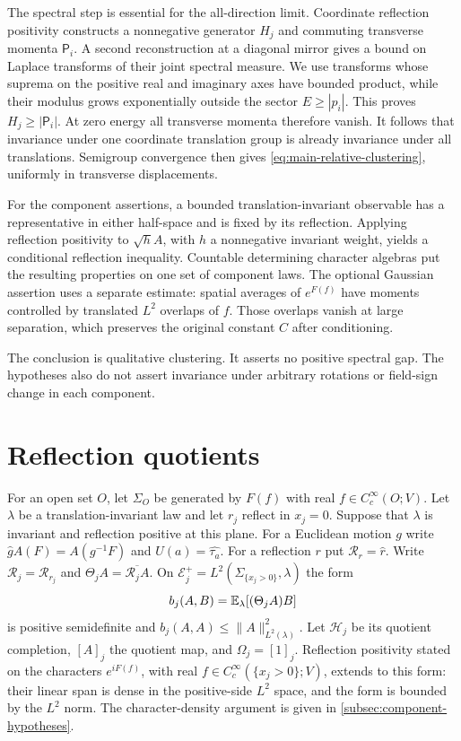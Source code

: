 The spectral step is essential for the all-direction limit.
Coordinate reflection positivity constructs a nonnegative generator
\(H_j\) and commuting transverse momenta \(\mathsf P_i\).
A second reconstruction at a diagonal mirror gives a bound on
Laplace transforms of their joint spectral measure. We use
transforms whose suprema on the positive real and imaginary axes
have bounded product, while their modulus grows exponentially
outside the sector \(E\ge|p_i|\).
This proves \(H_j\ge|\mathsf P_i|\).
At zero energy all transverse momenta therefore vanish.
It follows that invariance under one coordinate translation group
is already invariance under all translations. Semigroup convergence
then gives \eqref{eq:main-relative-clustering}, uniformly in
transverse displacements.

For the component assertions, a bounded translation-invariant
observable has a representative in either half-space and is fixed
by its reflection. Applying reflection positivity to \(\sqrt h A\),
with \(h\) a nonnegative invariant weight, yields a conditional
reflection inequality. Countable determining character algebras
put the resulting properties on one set of component laws.
The optional Gaussian assertion uses a separate estimate:
spatial averages of \(e^{F(f)}\) have moments controlled by
translated \(L^2\) overlaps of \(f\). Those overlaps vanish at
large separation, which preserves the original constant \(C\)
after conditioning.

The conclusion is qualitative clustering. It asserts no positive
spectral gap. The hypotheses also do not assert invariance under
arbitrary rotations or field-sign change in each component.
\section{Reflection quotients}\label{sec:quotients}
For an open set $O$, let $\Sigma_O$ be generated by $F(f)$ with
real $f\in C_c^\infty(O;V)$. Let $\lambda$ be a
translation-invariant law and let $r_j$ reflect in $x_j=0$.
Suppose that $\lambda$ is invariant and reflection positive at this
plane. For a Euclidean motion $g$ write
$\widehat g A(F)=A(g^{-1}F)$ and $U(a)=\widehat{\tau_a}$.
For a reflection $r$ put
$\mathcal R_r=\widehat r$. Write $\mathcal R_j=\mathcal R_{r_j}$ and
$\Theta_j A=\overline{\mathcal R_j A}$.
On $\mathcal E_j^+=L^2(\Sigma_{\{x_j>0\}},\lambda)$ the form
\[
 b_j(A,B)=\mathbb E_\lambda[(\Theta_j A)B]
\]
is positive semidefinite and $b_j(A,A)\le\|A\|_{L^2(\lambda)}^2$.
Let $\mathcal H_j$ be its quotient completion, $[A]_j$ the quotient
map, and $\Omega_j=[1]_j$.
Reflection positivity stated on the characters $e^{iF(f)}$, with
real $f\in C_c^\infty(\{x_j>0\};V)$, extends to this form:
their linear span is dense in the positive-side $L^2$ space, and the
form is bounded by the $L^2$ norm. The character-density argument is
given in \cref{subsec:component-hypotheses}.

